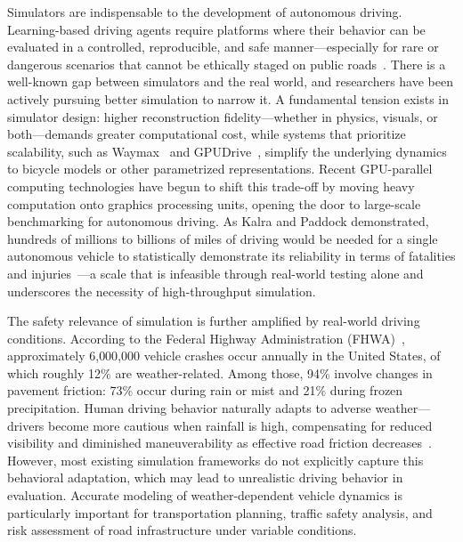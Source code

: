 
Simulators are indispensable to the development of autonomous driving.
Learning-based driving agents require platforms where their behavior can be evaluated in a controlled, reproducible, and safe manner—especially for rare or dangerous scenarios that cannot be ethically staged on public roads~\cite{grigorescu_av_survey_2020}.
There is a well-known gap between simulators and the real world, and researchers have been actively pursuing better simulation to narrow it.
A fundamental tension exists in simulator design: higher reconstruction fidelity—whether in physics, visuals, or both—demands greater computational cost, while systems that prioritize scalability, such as Waymax~\cite{gulino_waymax_2023} and GPUDrive~\cite{kazemkhani_gpudrive_2025}, simplify the underlying dynamics to bicycle models or other parametrized representations.
Recent GPU-parallel computing technologies have begun to shift this trade-off by moving heavy computation onto graphics processing units, opening the door to large-scale benchmarking for autonomous driving.
As Kalra and Paddock demonstrated, hundreds of millions to billions of miles of driving would be needed for a single autonomous vehicle to statistically demonstrate its reliability in terms of fatalities and injuries~\cite{kalra_driving_safety_2016}—a scale that is infeasible through real-world testing alone and underscores the necessity of high-throughput simulation.


The safety relevance of simulation is further amplified by real-world driving conditions.
According to the Federal Highway Administration (FHWA)~\cite{noauthor_how_nodate}, approximately 6{,}000{,}000 vehicle crashes occur annually in the United States, of which roughly 12\% are weather-related.
Among those, 94\% involve changes in pavement friction: 73\% occur during rain or mist and 21\% during frozen precipitation.
Human driving behavior naturally adapts to adverse weather—drivers become more cautious when rainfall is high, compensating for reduced visibility and diminished maneuverability as effective road friction decreases~\cite{chen_influence_2019, ahmed_impacts_2018, peng_examining_2018}.
However, most existing simulation frameworks do not explicitly capture this behavioral adaptation, which may lead to unrealistic driving behavior in evaluation.
Accurate modeling of weather-dependent vehicle dynamics is particularly important for transportation planning, traffic safety analysis, and risk assessment of road infrastructure under variable conditions.

